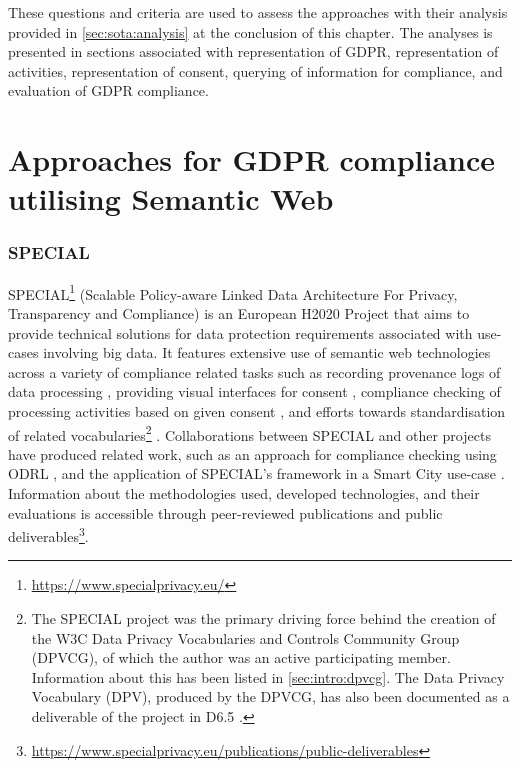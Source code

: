 These questions and criteria are used to assess the approaches with their analysis provided in \autoref{sec:sota:analysis} at the conclusion of this chapter.
The analyses is presented in sections associated with representation of GDPR, representation of activities, representation of consent, querying of information for compliance, and evaluation of GDPR compliance.

\section{Approaches for GDPR compliance utilising Semantic Web}\label{sec:sota:gdpr-semweb}

\subsubsection{SPECIAL}\label{sec:sota:SPECIAL}
SPECIAL\footnote{\url{https://www.specialprivacy.eu/}} (Scalable Policy-aware Linked Data Architecture For Privacy, Transparency and Compliance) is an European H2020 Project that aims to provide technical solutions for data protection requirements associated with use-cases involving big data. It features extensive use of semantic web technologies across a variety of compliance related tasks such as recording provenance logs of data processing \cite{kirrane_scalable_2018}, providing visual interfaces for consent \cite{drozd_consent_nodate,gritzalis_i_2019}, compliance checking of processing activities based on given consent \cite{westphal_spirit:_nodate,vos_odrl_2019,fernandez_user_2019}, and efforts towards standardisation of related vocabularies\footnote{The SPECIAL project was the primary driving force behind the creation of the W3C Data Privacy Vocabularies and Controls Community Group (DPVCG), of which the author was an active participating member. Information about this has been listed in \autoref{sec:intro:dpvcg}. The Data Privacy Vocabulary (DPV), produced by the DPVCG, has also been documented as a deliverable of the project in D6.5 \cite{pandit_d6.5_2019}.} \cite{bonatti_data_2018,pandit_creating_2019}.
Collaborations between SPECIAL and other projects have produced related work, such as an approach for compliance checking using ODRL \cite{agarwal_legislative_2018,vos_odrl_2019}, and the application of SPECIAL's framework in a Smart City use-case \cite{fernandez_user_2019}.
Information about the methodologies used, developed technologies, and their evaluations is accessible through peer-reviewed publications and public deliverables\footnote{\url{https://www.specialprivacy.eu/publications/public-deliverables}}.

